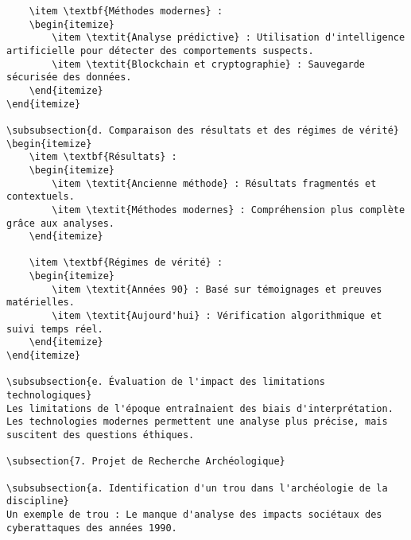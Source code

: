 \documentclass{article}
\begin{document}
\begin{verbatim}
    \item \textbf{Méthodes modernes} :
    \begin{itemize}
        \item \textit{Analyse prédictive} : Utilisation d'intelligence artificielle pour détecter des comportements suspects.
        \item \textit{Blockchain et cryptographie} : Sauvegarde sécurisée des données.
    \end{itemize}
\end{itemize}

\subsubsection{d. Comparaison des résultats et des régimes de vérité}
\begin{itemize}
    \item \textbf{Résultats} :
    \begin{itemize}
        \item \textit{Ancienne méthode} : Résultats fragmentés et contextuels.
        \item \textit{Méthodes modernes} : Compréhension plus complète grâce aux analyses.
    \end{itemize}

    \item \textbf{Régimes de vérité} :
    \begin{itemize}
        \item \textit{Années 90} : Basé sur témoignages et preuves matérielles.
        \item \textit{Aujourd'hui} : Vérification algorithmique et suivi temps réel.
    \end{itemize}
\end{itemize}

\subsubsection{e. Évaluation de l'impact des limitations technologiques}
Les limitations de l'époque entraînaient des biais d'interprétation. Les technologies modernes permettent une analyse plus précise, mais suscitent des questions éthiques.

\subsection{7. Projet de Recherche Archéologique}

\subsubsection{a. Identification d'un trou dans l'archéologie de la discipline}
Un exemple de trou : Le manque d'analyse des impacts sociétaux des cyberattaques des années 1990.


\end{verbatim}
\end{document}
